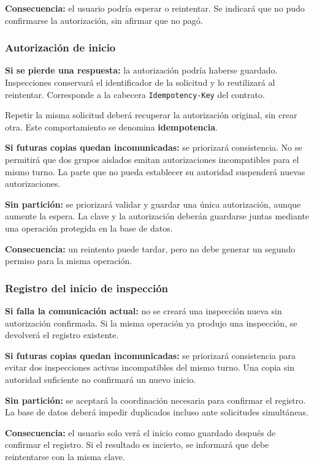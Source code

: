 \documentclass[11pt,a4paper]{article}
\begin{document}
\textbf{Consecuencia:} el usuario podría esperar o reintentar. Se indicará que no pudo confirmarse la autorización, sin afirmar que no pagó.

\subsubsection{Autorización de inicio}

\textbf{Si se pierde una respuesta:} la autorización podría haberse guardado. Inspecciones conservará el identificador de la solicitud y lo reutilizará al reintentar. Corresponde a la cabecera \texttt{Idempotency-Key} del contrato.

Repetir la misma solicitud deberá recuperar la autorización original, sin crear otra. Este comportamiento se denomina \textbf{idempotencia}.

\textbf{Si futuras copias quedan incomunicadas:} se priorizará consistencia. No se permitirá que dos grupos aislados emitan autorizaciones incompatibles para el mismo turno. La parte que no pueda establecer su autoridad suspenderá nuevas autorizaciones.

\textbf{Sin partición:} se priorizará validar y guardar una única autorización, aunque aumente la espera. La clave y la autorización deberán guardarse juntas mediante una operación protegida en la base de datos.

\textbf{Consecuencia:} un reintento puede tardar, pero no debe generar un segundo permiso para la misma operación.

\subsubsection{Registro del inicio de inspección}

\textbf{Si falla la comunicación actual:} no se creará una inspección nueva sin autorización confirmada. Si la misma operación ya produjo una inspección, se devolverá el registro existente.

\textbf{Si futuras copias quedan incomunicadas:} se priorizará consistencia para evitar dos inspecciones activas incompatibles del mismo turno. Una copia sin autoridad suficiente no confirmará un nuevo inicio.

\textbf{Sin partición:} se aceptará la coordinación necesaria para confirmar el registro. La base de datos deberá impedir duplicados incluso ante solicitudes simultáneas.

\textbf{Consecuencia:} el usuario solo verá el inicio como guardado después de confirmar el registro. Si el resultado es incierto, se informará que debe reintentarse con la misma clave.
\end{document}
